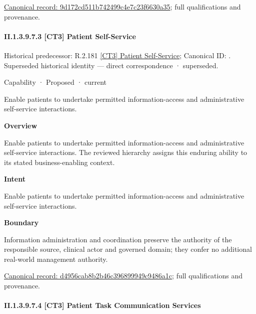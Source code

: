 {\footnotesize \href{../../../../continuum/strategy/capability/9d172cd511b742499c4e7c23f6630a35.md}{Canonical record: 9d172cd511b742499c4e7c23f6630a35}; full qualifications and provenance.}\par
\paragraph*{II.1.3.9.7.3 [CT3] Patient Self-Service}
\label{navigation:II.1.3.9.7.3}

{\small Historical predecessor: R.2.181 \hyperref[element:60f427e6b5764757b909624085a2af89]{[CT3] Patient Self-Service}; Canonical ID: \texttt{}. Superseded historical identity — direct correspondence · superseded.}\par
\label{element:d4956cab8b2b46c396899949c9486a1c}
{\small Capability · Proposed · current}\par

Enable patients to undertake permitted information-access and administrative self-service interactions.



\textbf{Overview}



Enable patients to undertake permitted information-access and administrative self-service interactions. The reviewed hierarchy assigns this enduring ability to its stated business-enabling context.



\textbf{Intent}



Enable patients to undertake permitted information-access and administrative self-service interactions.



\textbf{Boundary}



Information administration and coordination preserve the authority of the responsible source, clinical actor and governed domain; they confer no additional real-world management authority.


{\footnotesize \href{../../../../continuum/strategy/capability/d4956cab8b2b46c396899949c9486a1c.md}{Canonical record: d4956cab8b2b46c396899949c9486a1c}; full qualifications and provenance.}\par
\paragraph*{II.1.3.9.7.4 [CT3] Patient Task Communication Services}
\label{navigation:II.1.3.9.7.4}


